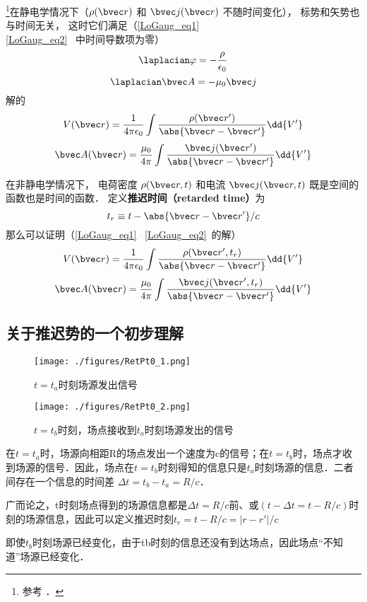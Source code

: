 

\footnote{参考 \cite{GriffE}．}在静电学情况下（$\rho(\bvec r)$ 和 $\bvec j(\bvec r)$ 不随时间变化）， 标势和矢势也与时间无关， 这时它们满足（\autoref{LoGaug_eq1}~ \autoref{LoGaug_eq2}~ 中时间导数项为零）
\begin{equation}
\laplacian \varphi = -\frac{\rho}{\epsilon_0}
\end{equation}
\begin{equation}
\laplacian \bvec A = -\mu_0 \bvec j
\end{equation}
解的
\begin{equation}
V(\bvec r) = \frac{1}{4\pi\epsilon_0} \int \frac{\rho(\bvec r')}{\abs{\bvec r - \bvec r'}} \dd{V'}
\end{equation}
\begin{equation}
\bvec A(\bvec r) = \frac{\mu_0}{4\pi} \int \frac{\bvec j(\bvec r')}{\abs{\bvec r - \bvec r'}} \dd{V'}
\end{equation}

在非静电学情况下， 电荷密度 $\rho(\bvec r, t)$ 和电流 $\bvec j(\bvec r, t)$ 既是空间的函数也是时间的函数． 定义\textbf{推迟时间（retarded time）}为
\begin{equation}
t_r \equiv t - \abs{\bvec r - \bvec r'}/c
\end{equation}
那么可以证明（\autoref{LoGaug_eq1}~ \autoref{LoGaug_eq2}~的解）
\begin{equation}
V(\bvec r) = \frac{1}{4\pi\epsilon_0} \int \frac{\rho(\bvec r', t_r)}{\abs{\bvec r - \bvec r'}} \dd{V'}
\end{equation}
\begin{equation}
\bvec A(\bvec r) = \frac{\mu_0}{4\pi} \int \frac{\bvec j(\bvec r', t_r)}{\abs{\bvec r - \bvec r'}} \dd{V'}
\end{equation}

\subsection{关于推迟势的一个初步理解}
\begin{figure}[ht]
\centering
\texttt{[image: ./figures/RetPt0\_1.png]}
\caption{$t=t_a$时刻场源发出信号} \label{RetPt0_fig1}
\end{figure}
\begin{figure}[ht]
\centering
\texttt{[image: ./figures/RetPt0\_2.png]}
\caption{$t=t_b$时刻，场点接收到$t_a$时刻场源发出的信号} \label{RetPt0_fig2}
\end{figure}

在$t=t_a$时，场源向相距R的场点发出一个速度为c的信号；在$t=t_b$时，场点才收到场源的信号．因此，场点在$t=t_b$时刻得知的信息只是$t_a$时刻场源的信息．二者间存在一个信息的时间差 $\Delta t= t_b-t_a = R/c $．

广而论之，t时刻场点得到的场源信息都是$\Delta t = R/c$前、或$(t-\Delta t = t-R/c)$时刻的场源信息，因此可以定义推迟时刻$t_r=t-R/c= |r-r'|/c$

即使$t_b$时刻场源已经变化，由于tb时刻的信息还没有到达场点，因此场点“不知道”场源已经变化．
